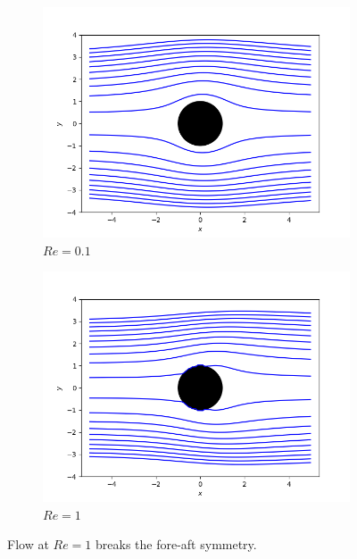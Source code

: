 \documentclass{article}
\begin{document}
\begin{figure}[H]
     \centering
     \begin{subfigure}[b]{0.49\textwidth}
         \centering
         \includegraphics[scale = 0.4]{Figs/oseen_Re_0_1.png}
         \caption{$Re=0.1$}
         \label{fig:Re_0.1}
     \end{subfigure}
     \begin{subfigure}[b]{0.49\textwidth}
         \centering
         \includegraphics[scale = 0.4]{Figs/oseen_Re_1.png}
         \caption{$Re=1$}
         \label{fig:Re_1}
     \end{subfigure}
     \caption{Flow at $Re=1$ breaks the fore-aft symmetry.}
  \label{fig:oseen_streamlines}
\end{figure}
\end{document}
